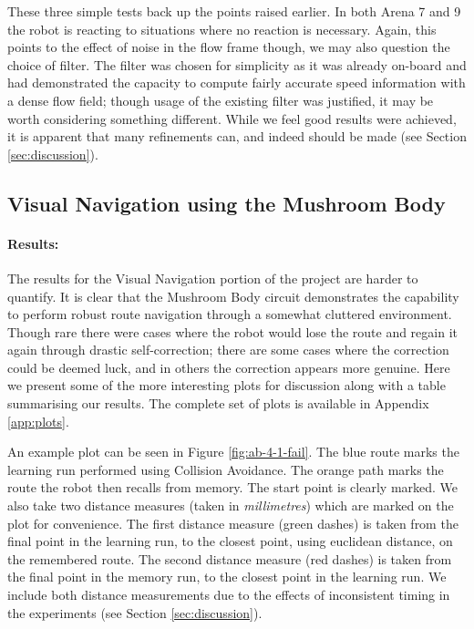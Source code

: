 \documentclass[a4paper,11pt,twoside,openright]{article}
\begin{document}
These three simple tests back up the points raised earlier.
In both Arena 7 and 9 the robot
is reacting to situations where no reaction is necessary. Again, this points to the effect of noise in the flow frame though, we may also
question the choice of filter. The filter was chosen for simplicity as it was already on-board and had demonstrated the capacity to compute
fairly accurate speed information \cite{Scimeca2017} with a dense flow field; though usage of the existing filter was justified,
it may be worth considering something different. While we feel good results were achieved, it is apparent that many refinements can, and indeed should
be made (see Section \ref{sec:discussion}).

\subsection{Visual Navigation using the Mushroom Body}
\paragraph{Results:}
The results for the Visual Navigation portion of the project are harder to quantify. It is clear that the Mushroom Body circuit
demonstrates the capability to perform robust route navigation through a somewhat cluttered environment. Though rare there were cases where the robot would
lose the route and regain it again through drastic self-correction; there are some cases where the correction could be deemed luck, and in others the correction
appears more genuine. Here we present some of the more interesting plots for discussion along with a table summarising our results.
The complete set of plots is available in Appendix \ref{app:plots}.
\newline

An example plot can be seen in Figure \ref{fig:ab-4-1-fail}. The blue route marks the
learning run performed using Collision Avoidance. The orange path marks the route the robot then recalls from memory. The start point is clearly marked.
We also take two distance measures (taken in \textit{millimetres}) which are marked on the plot for convenience. The first distance measure (green dashes) is taken from the final
point in the learning run, to the closest point, using euclidean distance, on the remembered route. The second distance measure (red dashes) is taken
from the final point in the memory run, to the closest point in the learning run. We include both distance measurements due to the effects of
inconsistent timing in the experiments (see Section \ref{sec:discussion}).
\newline
\end{document}
